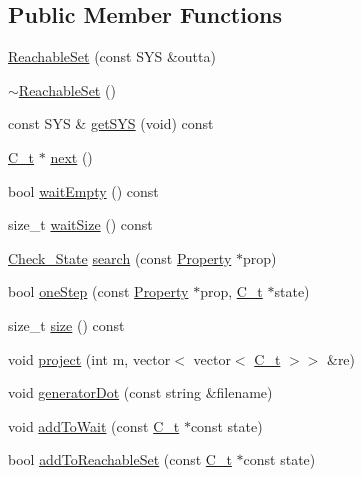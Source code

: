 \subsection*{Public Member Functions}
\begin{DoxyCompactItemize}
\item 
\mbox{\hyperlink{classgraphsat_1_1_reachable_set_a882955085fc1a10913253873b2d9be07}{Reachable\+Set}} (const S\+YS \&outta)
\item 
\mbox{\hyperlink{classgraphsat_1_1_reachable_set_abb174d0e553c9dc98ee5707fb9d72db5}{$\sim$\+Reachable\+Set}} ()
\item 
const S\+YS \& \mbox{\hyperlink{classgraphsat_1_1_reachable_set_a6254c1874c388dcab4be00b694458d4b}{get\+S\+YS}} (void) const
\item 
\mbox{\hyperlink{classgraphsat_1_1_reachable_set_a0b7981a216ec4c46be913e08d5f0cd07}{C\+\_\+t}} $\ast$ \mbox{\hyperlink{classgraphsat_1_1_reachable_set_a1de529cd581827bc7f43acea384af78b}{next}} ()
\item 
bool \mbox{\hyperlink{classgraphsat_1_1_reachable_set_abf81935c4ff3047a775bc99070b1faed}{wait\+Empty}} () const
\item 
size\+\_\+t \mbox{\hyperlink{classgraphsat_1_1_reachable_set_a7825d544d345f8fa18ad1780abe92d5d}{wait\+Size}} () const
\item 
\mbox{\hyperlink{namespacegraphsat_af9decc8bd71e7d6989593798fe86a63a}{Check\+\_\+\+State}} \mbox{\hyperlink{classgraphsat_1_1_reachable_set_a8c10e522762b721f4c24883ff7abb923}{search}} (const \mbox{\hyperlink{classgraphsat_1_1_property}{Property}} $\ast$prop)
\item 
bool \mbox{\hyperlink{classgraphsat_1_1_reachable_set_a243adff5738fe2f0c6b736c25c1e3420}{one\+Step}} (const \mbox{\hyperlink{classgraphsat_1_1_property}{Property}} $\ast$prop, \mbox{\hyperlink{classgraphsat_1_1_reachable_set_a0b7981a216ec4c46be913e08d5f0cd07}{C\+\_\+t}} $\ast$state)
\item 
size\+\_\+t \mbox{\hyperlink{classgraphsat_1_1_reachable_set_acf559d7f83f427600d8c17e4fed05a03}{size}} () const
\item 
void \mbox{\hyperlink{classgraphsat_1_1_reachable_set_aa69dd707012183b8c262362d6fb41907}{project}} (int m, vector$<$ vector$<$ \mbox{\hyperlink{classgraphsat_1_1_reachable_set_a0b7981a216ec4c46be913e08d5f0cd07}{C\+\_\+t}} $>$$>$ \&re)
\item 
void \mbox{\hyperlink{classgraphsat_1_1_reachable_set_a74be21480221cb48e2ce100ce712085b}{generator\+Dot}} (const string \&filename)
\item 
void \mbox{\hyperlink{classgraphsat_1_1_reachable_set_abcc03556aa2864cdc4b2c1e709b96111}{add\+To\+Wait}} (const \mbox{\hyperlink{classgraphsat_1_1_reachable_set_a0b7981a216ec4c46be913e08d5f0cd07}{C\+\_\+t}} $\ast$const state)
\item 
bool \mbox{\hyperlink{classgraphsat_1_1_reachable_set_acee5be3f5d294e0339c4bf3b9e690f51}{add\+To\+Reachable\+Set}} (const \mbox{\hyperlink{classgraphsat_1_1_reachable_set_a0b7981a216ec4c46be913e08d5f0cd07}{C\+\_\+t}} $\ast$const state)
\end{DoxyCompactItemize}
